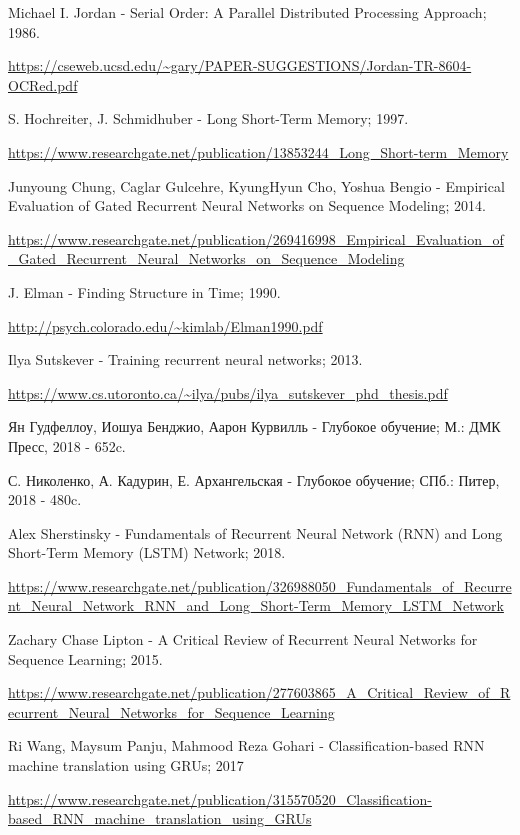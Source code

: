 	\begin{thebibliography}{}
		  Michael I. Jordan	-	Serial Order: A Parallel Distributed Processing Approach; 1986. 
		
		\url{https://cseweb.ucsd.edu/~gary/PAPER-SUGGESTIONS/Jordan-TR-8604-OCRed.pdf}
		
		  S. Hochreiter, J. Schmidhuber	-	Long Short-Term Memory; 1997.
		
		\url{https://www.researchgate.net/publication/13853244_Long_Short-term_Memory}
		
		  Junyoung Chung, Caglar Gulcehre, KyungHyun Cho, Yoshua Bengio	-	Empirical Evaluation of Gated Recurrent Neural Networks on Sequence Modeling; 2014.
		
		\url{https://www.researchgate.net/publication/269416998_Empirical_Evaluation_of_Gated_Recurrent_Neural_Networks_on_Sequence_Modeling}
		
		 J. Elman	-	Finding Structure in Time; 1990.
		
		\url{http://psych.colorado.edu/~kimlab/Elman1990.pdf}
		
		 Ilya Sutskever	-	Training recurrent neural networks; 2013.
		
		\url{https://www.cs.utoronto.ca/~ilya/pubs/ilya_sutskever_phd_thesis.pdf}
		
		 Ян Гудфеллоу, Иошуа Бенджио, Аарон Курвилль	-	Глубокое обучение; М.: ДМК Пресс, 2018 - 652c. 
		
		 С. Николенко, А. Кадурин, Е. Архангельская	-	Глубокое обучение;  СПб.: Питер, 2018 - 480c.
		
		 Alex Sherstinsky	-	Fundamentals of Recurrent Neural Network (RNN) and Long Short-Term Memory (LSTM) Network; 2018.
		
		\url{https://www.researchgate.net/publication/326988050_Fundamentals_of_Recurrent_Neural_Network_RNN_and_Long_Short-Term_Memory_LSTM_Network}
		
		 Zachary Chase Lipton	-	A Critical Review of Recurrent Neural Networks for Sequence Learning; 2015.
		
		\url{https://www.researchgate.net/publication/277603865_A_Critical_Review_of_Recurrent_Neural_Networks_for_Sequence_Learning}
		
		 Ri Wang, Maysum Panju, Mahmood Reza Gohari -   Classification-based RNN machine translation using GRUs; 2017
		
		\url{https://www.researchgate.net/publication/315570520_Classification-based_RNN_machine_translation_using_GRUs}
		

\end{thebibliography}
